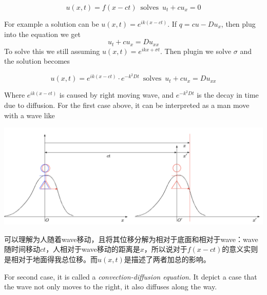 \documentclass[10pt]{article}
\newenvironment{changemargin}[2]{%
  \begin{list}{}{%
    \setlength{\topsep}{0pt}%
    \setlength{\leftmargin}{#1}%
    \setlength{\rightmargin}{#2}%
    \setlength{\listparindent}{\parindent}%
    \setlength{\itemindent}{\parindent}%
    \setlength{\parsep}{\parskip}%
  }%
  \item[]}{\end{list}}
\begin{document}
\begin{changemargin}{-0.125in}{0in}
\begin{enumerate}
\begin{enumerate}
	             \begin{tcolorbox}[notitle,boxrule=0pt,colback=orange!20,colframe=blue!20]
                  \[
                    u(x,t) = f(x - ct)  \,\,\, \text{solves} \,\,\,u_t + cu_x = 0  
                  \]
                   \end{tcolorbox}
                   For example a solution can be $u(x,t) = e^{ik(x - ct)}$. If $q = cu - Du_x$, then plug into the equation we get 
                   \[
                   u_t + cu_x = Du_{xx} 
                   \]
                   To solve this we still assuming $u(x,t) = e^{ikx + \sigma t}$. Then plugin we solve $\sigma$ and the solution becomes 
                   \begin{tcolorbox}[notitle,boxrule=0pt,colback=orange!20,colframe=blue!20]
                  \[
                    u(x,t) = e^{ik(x-ct)} \cdot e^{-k^2Dt}  \,\,\, \text{solves} \,\,\,u_t + cu_x = Du_{xx}  
                  \]
                   \end{tcolorbox}

                   
	               Where $e^{ik(x-ct)}$ is caused by right moving wave, and $e^{-k^2Dt}$ is the decay in time due to diffusion. For the first case above, it can be interpreted as a man move with a wave like 
	              \begin{center}

	              \includegraphics[scale = 0.3]{wave}
	            
	              \end{center}
	             可以理解为人随着wave移动，且将其位移分解为相对于底面和相对于wave：wave随时间移动$ct$，人相对于wave移动的距离是$x$，所以说对于$f(x - ct)$的意义实则是相对于地面得我总位移。而$u(x,t)$是描述了两者加总的影响。
	             
	             \smallskip
	             
	             For second case, it is called a \textit{convection-diffusion equation}. It depict a case that the wave not only moves to the right, it also diffuses along the way. 
	             

\end{enumerate}
\end{enumerate}
\end{changemargin}
\end{document}
